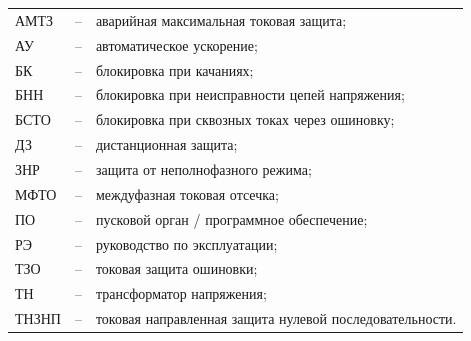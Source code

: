 \color{uniblue}\section*{}
\color{black}
\begin{longtable}{>{\raggedright\arraybackslash}m{2cm}>{\raggedright\arraybackslash}m{0.5cm}>{\raggedright\arraybackslash}m{20cm}}
\endfirsthead\endhead\endfoot\endlastfoot
АМТЗ & -- & аварийная максимальная токовая защита; \\
АУ & -- & автоматическое ускорение; \\
БК & -- & блокировка при качаниях; \\
БНН & -- & блокировка при неисправности цепей напряжения; \\
БСТО & -- & блокировка при сквозных токах через ошиновку; \\
ДЗ & -- & дистанционная защита; \\
ЗНР & -- & защита от неполнофазного режима; \\
МФТО & -- & междуфазная токовая отсечка; \\
ПО & -- & пусковой орган / программное обеспечение; \\
РЭ & -- & руководство по эксплуатации; \\
ТЗО & -- & токовая защита ошиновки; \\
ТН & -- & трансформатор напряжения; \\
ТНЗНП & -- & токовая направленная защита нулевой последовательности. \\
\end{longtable}